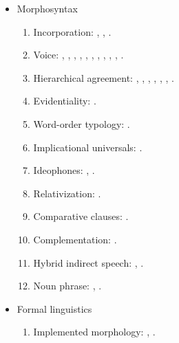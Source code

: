 \documentclass[oneside,a4paper,11pt]{article}
\newcommand{\langue}[2]{#1}
\begin{document}
\begin{itemize}
\begin{itemize}
\item \langue{Morphosyntax}{Morphosyntaxe}
\begin{enumerate}
\item  Incorporation: \cite{jacques11tangut.verb}, \cite{jacques12demotion}, \cite{jacques12incorp}.
\item  \langue{Voice}{Voix}:  \cite{jacques07passif}, \cite{jacques10refl}, \cite{jacques12demotion}, \cite{jacques13derivational.khaling}, \cite{jacques13tropative}, \cite{jacques14antipassive}, \cite{jacques15derivational.khaling}, \cite{jacques15causative},  \cite{jacques15spontaneous},  \cite{jacques16si}, \cite{jacques17generic}.
\item \langue{Hierarchical agreement}{Indexation hiérarchique}:  \cite{jacques10inverse},     \cite{jacques12khaling},   \cite{antonov14rtau}, \cite{jacques14inverse}, \cite{jacques14rtau}, \cite{jacques16th}, \cite{jacques17stau}.
\item \langue{Evidentiality}{Evidentialité}: \cite{jacques14auditory}.
\item \langue{Word-order typology}{Typologie de l'ordre des mots}: \cite{jacques13harmonization}.
\item \langue{Implicational universals}{Universels implicationnels}: \cite{antonov14need}.
\item \langue{Ideophones}{Idéophones}: \cite{japhug14ideophones}, \cite{jacques17ipa}.
\item \langue{Relativization}{Relatives}: \cite{jacques16relatives}.
\item \langue{Comparative clauses}{Comparatives}: \cite{jacques16comparative}.
\item \langue{Complementation}{Complétives}: \cite{jacques16complementation}.
\item \langue{Hybrid indirect speech}{Discours indirect hybride}: \cite{jacques16complementation}, \cite{jacques17stau}.
\item \langue{Noun phrase}{Syntagmes nominaux}: \cite{jacques17num}, \cite{jacques17sketch}.
\end{enumerate}

\item \langue{Formal linguistics}{Linguistique formelle}
\begin{enumerate}
\item \langue{Implemented morphology}{Morphologie implémentée}: \cite{walther14inv.canon}, \cite{walther14compactness}.
\end{enumerate}


\end{itemize}
\end{itemize}
\end{document}
